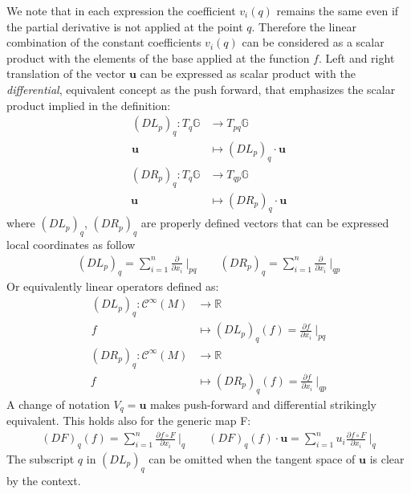 We note that in each expression the coefficient $v_{i}(q)$ remains the same even if the partial derivative is not applied at the point $q$. Therefore the linear combination of the constant coefficients $v_{i}(q)$ can be considered as a scalar product with the elements of the base applied at the function $f$.
Left and right translation of the vector $\mathbf{u}$ can be expressed as scalar product with the \emph{differential}, equivalent concept as the push forward, that emphasizes the scalar product implied in the definition:
\begin{align*}
(DL_{p})_{q} : T_{q} \mathbb{G}& \longrightarrow  T_{pq}\mathbb{G}    \\
\mathbf{u} &\longmapsto  (DL_{p})_{q} \cdot \mathbf{u} 
\end{align*}
\begin{align*}
(DR_{p})_{q} : T_{q} \mathbb{G} & \longrightarrow  T_{qp}\mathbb{G}    \\
\mathbf{u} &\longmapsto  (DR_{p})_{q} \cdot \mathbf{u}
\end{align*}
where $(DL_{p})_{q}$, $(DR_{p})_{q}$ are properly defined vectors that can be expressed local coordinates as follow
\begin{align*}
(DL_{p})_{q} = \sum_{i=1}^{n}\frac{\partial }{\partial x_{i}} ~\Bigr|_{pq}
\qquad 
(DR_{p})_{q} = \sum_{i=1}^{n} \frac{\partial }{\partial x_{i}} ~\Bigr|_{qp}
\end{align*}
Or equivalently linear operators defined as:
\begin{align*}
(DL_{p})_{q} : \mathcal{C}^{\infty}(M) & \longrightarrow  \mathbb{R}   \\
 f &\longmapsto  (DL_{p})_{q} (f) = \frac{\partial f}{\partial x_{i}} ~\Bigr|_{pq} 
 \end{align*}
 \begin{align*}
(DR_{p})_{q} : \mathcal{C}^{\infty}(M) & \longrightarrow  \mathbb{R} \\
f &\longmapsto  (DR_{p})_{q} (f) = \frac{\partial f}{\partial x_{i}} ~\Bigr|_{qp}
\end{align*}
A change of notation $V_{q} = \mathbf{u}$ makes push-forward and differential strikingly equivalent. This holds also for the generic map F:
\begin{align*}
(DF)_{q} (f)= \sum_{i=1}^{n}\frac{\partial f\circ F}{\partial x_{i}} ~\Bigr|_{q}
\qquad
(DF)_{q} (f)\cdot \mathbf{u}  = \sum_{i=1}^{n} u_{i}\frac{\partial f\circ F}{\partial x_{i}} ~\Bigr|_{q}
\end{align*}
The subscript $q$ in $(DL_{p})_{q}$ can be omitted when the tangent space of $\mathbf{u}$ is clear by the context. 

